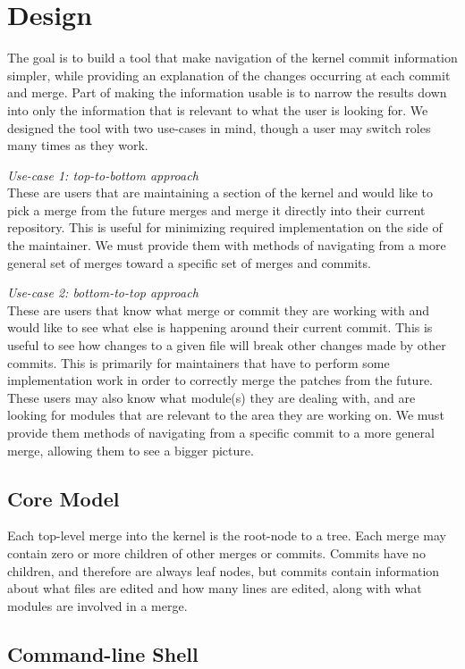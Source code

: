 \documentclass[conference, draftclsnofoot]{IEEEtran}
\begin{document}
\section{Design}

The goal is to build a tool that make navigation of the kernel commit
information simpler, while providing an explanation of the changes occurring at
each commit and merge. Part of making the information usable is to narrow the
results down into only the information that is relevant to what the user is
looking for. We designed the tool with two use-cases in mind, though a user may
switch roles many times as they work.

\textit{Use-case 1: top-to-bottom approach}\\
These are users that are maintaining a section of the kernel and would like to
pick a merge from the future merges and merge it directly into their current
repository. This is useful for minimizing required implementation on the side
of the maintainer. We must provide them with methods of navigating from a more
general set of merges toward a specific set of merges and commits.

\textit{Use-case 2: bottom-to-top approach}\\
These are users that know what merge or commit they are working with and would
like to see what else is happening around their current commit. This is useful
to see how changes to a given file will break other changes made by other
commits. This is primarily for maintainers that have to perform some
implementation work in order to correctly merge the patches from the future.
These users may also know what module(s) they are dealing with, and are looking
for modules that are relevant to the area they are working on. We must provide
them methods of navigating from a specific commit to a more general merge,
allowing them to see a bigger picture.

\subsection{Core Model}
Each top-level merge into the kernel is the root-node to a tree. Each merge
may contain zero or more children of other merges or commits. Commits have no
children, and therefore are always leaf nodes, but commits contain information
about what files are edited and how many lines are edited, along with what
modules are involved in a merge.

\subsection{Command-line Shell}
\end{document}
